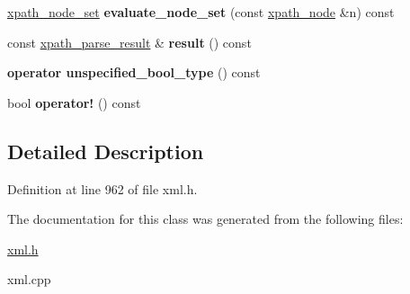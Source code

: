\begin{DoxyCompactItemize}
\item 
\hypertarget{classphys_1_1xml_1_1xpath__query_a885b83b3082e88c477934e72b19a65ae}{
\hyperlink{classphys_1_1xml_1_1xpath__node__set}{xpath\_\-node\_\-set} {\bfseries evaluate\_\-node\_\-set} (const \hyperlink{classphys_1_1xml_1_1xpath__node}{xpath\_\-node} \&n) const }
\label{de/d9e/classphys_1_1xml_1_1xpath__query_a885b83b3082e88c477934e72b19a65ae}

\item 
\hypertarget{classphys_1_1xml_1_1xpath__query_a1b57c9d69fff49b94b03ad33132d8531}{
const \hyperlink{structphys_1_1xml_1_1xpath__parse__result}{xpath\_\-parse\_\-result} \& {\bfseries result} () const }
\label{de/d9e/classphys_1_1xml_1_1xpath__query_a1b57c9d69fff49b94b03ad33132d8531}

\item 
\hypertarget{classphys_1_1xml_1_1xpath__query_a97998963246521002d11ba405f8e6b32}{
{\bfseries operator unspecified\_\-bool\_\-type} () const }
\label{de/d9e/classphys_1_1xml_1_1xpath__query_a97998963246521002d11ba405f8e6b32}

\item 
\hypertarget{classphys_1_1xml_1_1xpath__query_ae06c5426b9e32143b1881cf12af50390}{
bool {\bfseries operator!} () const }
\label{de/d9e/classphys_1_1xml_1_1xpath__query_ae06c5426b9e32143b1881cf12af50390}

\end{DoxyCompactItemize}


\subsection{Detailed Description}


Definition at line 962 of file xml.h.



The documentation for this class was generated from the following files:\begin{DoxyCompactItemize}
\item 
\hyperlink{xml_8h}{xml.h}\item 
xml.cpp\end{DoxyCompactItemize}

